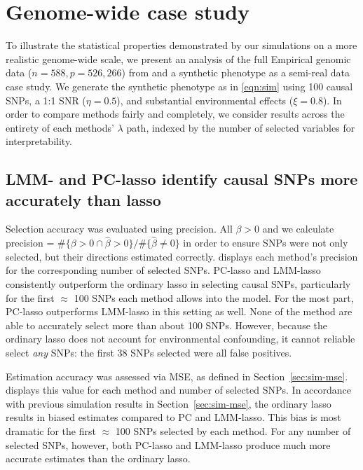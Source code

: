 \section{Genome-wide case study} \label{sec:gw_cs}

To illustrate the statistical properties demonstrated by our simulations on a more realistic genome-wide scale, we present an analysis of the full Empirical genomic data ($n=588, p=526,266$) from \citet{larkin2015objectives} and a synthetic phenotype as a semi-real data case study. We generate the synthetic phenotype as in \eqref{eqn:sim} using 100 causal SNPs, a 1:1 SNR ($\eta = 0.5$), and substantial environmental effects ($\xi = 0.8$). In order to compare methods fairly and completely, we consider results across the entirety of each methods' $\lambda$ path, indexed by the number of selected variables for interpretability.

\subsection{LMM- and PC-lasso identify causal SNPs more accurately than lasso}

Selection accuracy was evaluated using precision. All $\beta > 0$ and we calculate precision = $\#\{ \beta > 0 \cap \widehat{\beta} > 0  \}/\#\{ \widehat{\beta} \ne 0 \}$ in order to ensure SNPs were not only selected, but their directions estimated correctly.  displays each method's precision for the corresponding number of selected SNPs. PC-lasso and LMM-lasso consistently outperform the ordinary lasso in selecting causal SNPs, particularly for the first $\approx$ 100 SNPs each method allows into the model. For the most part, PC-lasso outperforms LMM-lasso in this setting as well. None of the method are able to accurately select more than about 100 SNPs.  However, because the ordinary lasso does not account for environmental confounding, it cannot reliable select \emph{any} SNPs: the first 38 SNPs selected were all false positives.

Estimation accuracy was assessed via MSE, as defined in Section~\ref{sec:sim-mse}.  displays this value for each method and number of selected SNPs. In accordance with previous simulation results in Section~\ref{sec:sim-mse}, the ordinary lasso results in biased estimates compared to PC and LMM-lasso. This bias is most dramatic for the first $\approx$ 100 SNPs selected by each method. For any number of selected SNPs, however, both PC-lasso and LMM-lasso produce much more accurate estimates than the ordinary lasso.

